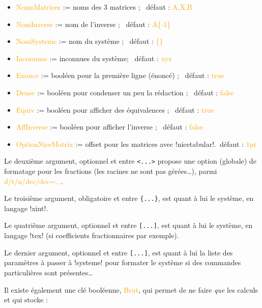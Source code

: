 \documentclass[french,a4paper,11pt]{article}
\newcommand\Cle[1]{{\small\sffamily\textlangle \textcolor{orange}{#1}\textrangle}}
\begin{document}
{{\begin{tipblock}
\begin{itemize}
	\item \Cle{NomsMatrices} := noms des 3 matrices ; \hfill~défaut : \Cle{A,X,B}
	\item \Cle{NomInverse} := nom de l'inverse ; \hfill~défaut : \Cle{A\{-1\}}
	\item \Cle{NomSysteme} := nom du système ; \hfill~défaut : \Cle{\{\}}
	\item \Cle{Inconnues} := inconnues du système; \hfill~défaut : \Cle{xyz}
	\item \Cle{Enonce} := booléen pour la première ligne (énoncé) ; \hfill~défaut : \Cle{true}
	\item \Cle{Dense} := booléen pour condenser un peu la rédaction ; \hfill~défaut : \Cle{false}
	\item \Cle{Equiv} := booléen pour afficher des équivalences ; \hfill~défaut : \Cle{true}
	\item \Cle{AffInverse} := booléen pour afficher l'inverse ; \hfill~défaut : \Cle{false}
	\item \Cle{OptionNiceMatrix} := offset pour les matrices avec \motcletex!nicetabular!.\hfill~défaut : \Cle{1pt}
\end{itemize}

Le deuxième argument, optionnel et entre \texttt{<...>} propose une option (globale) de formatage pour les fractions (les racines ne sont pas gérées\ldots), parmi \Cle{d/t/n/dec/dec=...}.

\smallskip

Le troisième argument, obligatoire et entre \texttt{\{...\}}, est quant à lui le système, en langage \motcletex!xint!.

\smallskip

Le quatrième argument, optionnel et entre \texttt{[...]}, est quant à lui le système, en langage \motcletex!tex! (si coefficients fractionnaires par exemple).

\smallskip

Le dernier argument, optionnel et entre \texttt{[...]}, est quant à lui la liste des paramètres à passer à \motcletex!systeme! pour formater le système si des commandes particulières sont présentes\ldots
\end{tipblock}

\begin{tipblock}
Il existe également une clé booléenne, \Cle{Brut}, qui permet de ne faire \textit{que} les calculs et qui stocke :


\end{tipblock}}}
\end{document}
